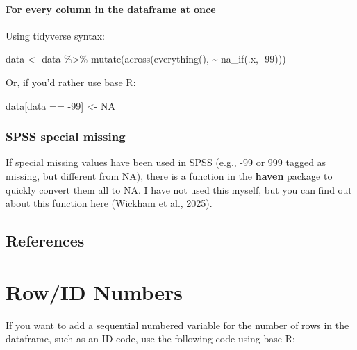 \documentclass[
  letterpaper,
  DIV=11,
  numbers=noendperiod]{scrreprt}
\newenvironment{Shaded}{\begin{snugshade}}{\end{snugshade}}
\newcommand{\ConstantTok}[1]{\textcolor[rgb]{0.56,0.35,0.01}{#1}}
\newcommand{\DecValTok}[1]{\textcolor[rgb]{0.68,0.00,0.00}{#1}}
\newcommand{\FunctionTok}[1]{\textcolor[rgb]{0.28,0.35,0.67}{#1}}
\newcommand{\NormalTok}[1]{\textcolor[rgb]{0.00,0.23,0.31}{#1}}
\newcommand{\OtherTok}[1]{\textcolor[rgb]{0.00,0.23,0.31}{#1}}
\newcommand{\SpecialCharTok}[1]{\textcolor[rgb]{0.37,0.37,0.37}{#1}}
\begin{document}
\subsubsection{For every column in the dataframe at
once}\label{for-every-column-in-the-dataframe-at-once}

Using tidyverse syntax:

\begin{Shaded}
\begin{Highlighting}[]
\NormalTok{data }\OtherTok{\textless{}{-}}\NormalTok{ data }\SpecialCharTok{\%\textgreater{}\%}
  \FunctionTok{mutate}\NormalTok{(}\FunctionTok{across}\NormalTok{(}\FunctionTok{everything}\NormalTok{(), }\SpecialCharTok{\textasciitilde{}} \FunctionTok{na\_if}\NormalTok{(.x, }\SpecialCharTok{{-}}\DecValTok{99}\NormalTok{)))}
\end{Highlighting}
\end{Shaded}

Or, if you'd rather use base R:

\begin{Shaded}
\begin{Highlighting}[]
\NormalTok{data[data }\SpecialCharTok{==} \SpecialCharTok{{-}}\DecValTok{99}\NormalTok{] }\OtherTok{\textless{}{-}} \ConstantTok{NA}
\end{Highlighting}
\end{Shaded}

\subsection{SPSS special missing}\label{spss-special-missing}

If special missing values have been used in SPSS (e.g., -99 or 999
tagged as missing, but different from NA), there is a function in the
\textbf{haven} package to quickly convert them all to NA. I have not
used this myself, but you can find out about this function
\href{https://haven.tidyverse.org/reference/zap_missing.html}{here}
(Wickham et al., 2025).

\section{References}\label{references-3}

\chapter{Row/ID Numbers}\label{rowid-numbers}

If you want to add a sequential numbered variable for the number of rows
in the dataframe, such as an ID code, use the following code using base
R:
\end{document}

